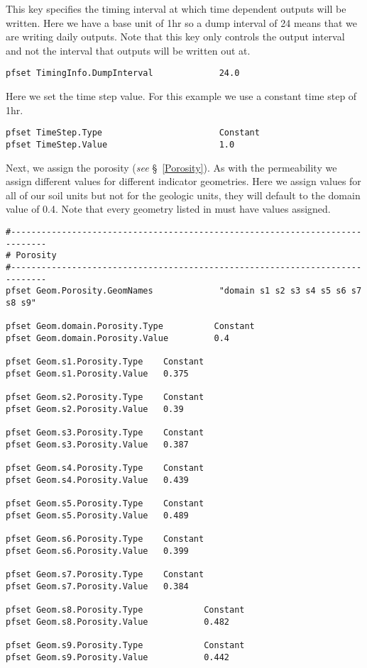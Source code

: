 This key specifies the timing interval at which \parflow{} time dependent outputs will be written. 
Here we have a base unit of 1hr so a dump interval of 24 means that we are writing daily outputs. 
Note that this key only controls the \parflow{} output interval and not the interval that 
outputs will be written out at. 

\begin{verbatim}
pfset TimingInfo.DumpInterval             24.0
\end{verbatim}

Here we set the time step value. For this example we use a constant time step of 1hr. 

\begin{verbatim}
pfset TimeStep.Type                       Constant
pfset TimeStep.Value                      1.0
\end{verbatim}

Next, we assign the porosity (\emph{see} \S~\ref{Porosity}).  As with the permeability
we assign different values for different indicator geometries. Here we assign 
values for all of our soil units but not for the geologic units, they will default to the
domain value of 0.4. Note that every geometry listed in  must have 
values assigned. 

\begin{verbatim}
#-----------------------------------------------------------------------------
# Porosity
#-----------------------------------------------------------------------------
pfset Geom.Porosity.GeomNames             "domain s1 s2 s3 s4 s5 s6 s7 s8 s9"

pfset Geom.domain.Porosity.Type          Constant
pfset Geom.domain.Porosity.Value         0.4

pfset Geom.s1.Porosity.Type    Constant
pfset Geom.s1.Porosity.Value   0.375

pfset Geom.s2.Porosity.Type    Constant
pfset Geom.s2.Porosity.Value   0.39

pfset Geom.s3.Porosity.Type    Constant
pfset Geom.s3.Porosity.Value   0.387

pfset Geom.s4.Porosity.Type    Constant
pfset Geom.s4.Porosity.Value   0.439

pfset Geom.s5.Porosity.Type    Constant
pfset Geom.s5.Porosity.Value   0.489

pfset Geom.s6.Porosity.Type    Constant
pfset Geom.s6.Porosity.Value   0.399

pfset Geom.s7.Porosity.Type    Constant
pfset Geom.s7.Porosity.Value   0.384

pfset Geom.s8.Porosity.Type            Constant
pfset Geom.s8.Porosity.Value           0.482

pfset Geom.s9.Porosity.Type            Constant
pfset Geom.s9.Porosity.Value           0.442
\end{verbatim}

